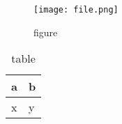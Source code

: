 \begin{figure}[htbp]
\centering
\texttt{[image: file.png]}
\caption{figure}
\label{figure}
\end{figure}

\begin{table}[htbp]
\begin{minipage}{\linewidth}
\setlength{\tymax}{0.5\linewidth}
\centering
\small
\caption{table}
\label{table}
\begin{tabulary}{\textwidth}{@{}LL@{}} \toprule
a&b\\
\midrule
x&y\\

\bottomrule

\end{tabulary}
\end{minipage}
\end{table}





